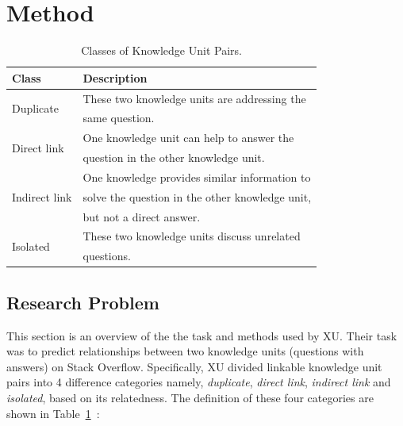 \documentclass[sigconf]{acmart}
\theoremstyle{break}
\newcommand{\tab}[1]{Table~\ref{tab:#1}}
\begin{document}
\section{Method}\label{method}

\begin{table}[!htp]
\caption{Classes of Knowledge Unit Pairs.}\label{tab:classes}
\centering
\begin{tabular}{l|l}
\hline
\rowcolor{lightgray}
Class & Description  \\\hline
\multirow{2}{*}{Duplicate} & These two knowledge units are addressing the\\
                          & same  question.\\ \hline
\multirow{2}{*}{Direct link}& One knowledge unit can help to  answer the\\ 
                         &  question in the other  knowledge unit.\\ \hline
\multirow{3}{*}{Indirect link}& One knowledge provides similar information to\\
                         &  solve the  question in the other knowledge unit, \\
                         &  but not a direct answer.\\ \hline
\multirow{2}{*}{Isolated}& These two knowledge units discuss unrelated \\
                         & questions.\\ \hline
\end{tabular}
\end{table}


\subsection{Research Problem}\label{problem}


This section is an overview of the the task and methods 
used by XU. Their task was to  predict relationships between two knowledge units (questions with answers) on Stack Overflow. Specifically, 
XU  divided linkable knowledge  unit pairs
into 4 difference categories namely, {\it duplicate}, {\it direct link}, {\it indirect link} and {\it isolated}, 
based on its relatedness. The definition of these four categories are shown in \tab{classes}~\cite{xu2016predicting}:
\end{document}
